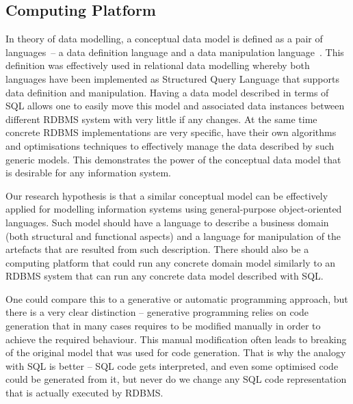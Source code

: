 \documentclass[a4paper,12pt,oneside,openright,final]{memoir} %
\begin{document}
	
		
	
 
\subsection*{Computing Platform}

	In theory of data modelling, a conceptual data model is defined as a pair of languages~-- a data definition language and a data manipulation language~\cite{kal1983}.
  	This definition was effectively used in relational data modelling whereby both languages have been implemented as Structured Query Language that supports data definition and manipulation.
  	Having a data model described in terms of SQL allows one to easily move this model and associated data instances between different RDBMS system with very little if any changes.
  	At the same time concrete RDBMS implementations are very specific, have their own algorithms and optimisations techniques to effectively manage the data described by such generic models.
  	This demonstrates the power of the conceptual data model that is desirable for any information system.
  
  Our research hypothesis is that a similar conceptual model can be effectively applied for modelling information systems using general-purpose object-oriented languages.
  Such model should have a language to describe a business domain (both structural and functional aspects) and a language for manipulation of the artefacts that are resulted from such description.
  There should also be a computing platform that could run any concrete domain model similarly to an RDBMS system that can run any concrete data model described with SQL.
  
  One could compare this to a generative or automatic programming approach, but there is a very clear distinction -- generative programming relies on code generation that in many cases requires to be modified manually in order to achieve the required behaviour.
  This manual modification often leads to breaking of the original model that was used for code generation.
  That is why the analogy with SQL is better -- SQL code gets interpreted, and even some optimised code could be generated from it, but never do we change any SQL code representation that is actually executed by RDBMS.
    
\end{document}
